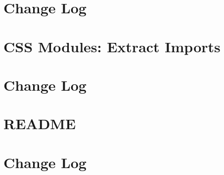 \documentclass[twoside]{book}
\newcommand{\+}{\discretionary{\mbox{\scriptsize$\hookleftarrow$}}{}{}}
\begin{document}
\chapter{Change Log}
\label{md__c___users_vaishnavi_jadhav__desktop__developer_code_mean_stack_example_client_node_modules_p7ef885b4854aa9b7596770eedab5fdad}

\chapter{CSS Modules\+: Extract Imports}
\label{md__c___users_vaishnavi_jadhav__desktop__developer_code_mean_stack_example_client_node_modules_p7f0196f2b8da95ee6424258b06b825f1}

\chapter{Change Log}
\label{md__c___users_vaishnavi_jadhav__desktop__developer_code_mean_stack_example_client_node_modules_p5914fc5753a644b44bcd09cb2e0cc033}

\chapter{README}
\label{md__c___users_vaishnavi_jadhav__desktop__developer_code_mean_stack_example_client_node_modules_pb7018ef5bdc5a03c60ae6efbc9211363}

\chapter{Change Log}
\label{md__c___users_vaishnavi_jadhav__desktop__developer_code_mean_stack_example_client_node_modules_p7e267b7b7eb3bc0a7b2d0757b1036d34}

\end{document}
